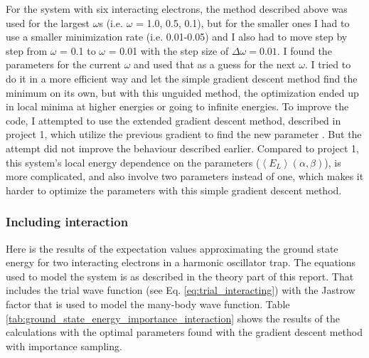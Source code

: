 For the system with six interacting electrons, the method described above was used for the largest $\omega$s (i.e. $\omega$ = 1.0, 0.5, 0.1), but for the smaller ones I had to use a smaller minimization rate (i.e. 0.01-0.05) and I also had to move step by step from $\omega$ = 0.1 to $\omega$ = 0.01 with the step size of $\Delta \omega = 0.01$. I found the parameters for the current $\omega$ and used that as a guess for the next $\omega$. I tried to do it in a more efficient way and let the simple gradient descent method find the minimum on its own, but with this unguided method, the optimization ended up in local minima at higher energies or going to infinite energies. To improve the code, I attempted to use the extended gradient descent method, described in project 1, which utilize the previous gradient to find the new parameter  \cite{project1}. But the attempt did not improve the behaviour described earlier. Compared to project 1, this system's local energy dependence on the parameters  ($\left< E_L \right> (\alpha, \beta)$), is more complicated, and also involve two parameters instead of one, which makes it harder to optimize the parameters with this simple gradient descent method.


\subsubsection{Including interaction}

Here is the results of the expectation values approximating the ground state energy for two interacting electrons in a harmonic oscillator trap. The equations used to model the system is as described in the theory part of this report. That includes the trial wave function (see Eq. \ref{eq:trial_interacting}) with the Jastrow factor that is used to model the many-body wave function. Table \ref{tab:ground_state_energy_importance_interaction} shows the results of the calculations with the optimal parameters found with the gradient descent method with importance sampling. 


